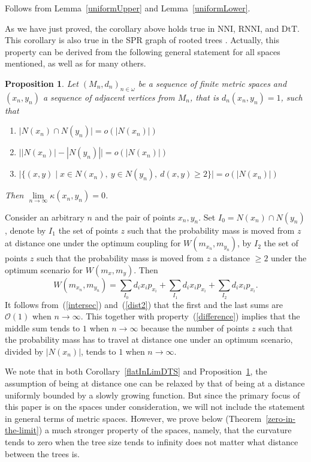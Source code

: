 \documentclass[11pt]{amsart}
\newtheorem{proposition}[lemma]{Proposition}
\theoremstyle{definition}
\newcommand{\nni}{\mathrm{NNI}}
\newcommand{\rnni}{\mathrm{RNNI}}
\newcommand{\dtt}{\mathrm{DtT}}
\renewcommand{\O}{\mathcal{O}}
\begin{document}
{\proof
Follows from Lemma~\ref{uniformUpper} and Lemma~\ref{uniformLower}.
\endproof

As we have just proved, the corollary above holds true in $\nni$, $\rnni$, and $\dtt$.
This corollary is also true in the SPR graph of rooted trees \autocite{Whidden2015-es}.
Actually, this property can be derived from the following general statement for all spaces mentioned, as well as for many others.

\begin{proposition}
\label{flatInLimGen}
Let $(M_n,d_n)_{n \in \omega}$ be a sequence of finite metric spaces and $(x_n, y_n)$ a sequence of adjacent vertices from $M_n$, that is $d_n(x_n,y_n) = 1$, such that
 \begin{enumerate} [(1)]
\item
\label{intersec}
$\big|N(x_n) \cap N(y_n)\big| = o(|N(x_n)|)$
\item
\label{difference}
$\big||N(x_n)| - |N(y_n)|\big| = o(|N(x_n)|)$
\item
\label{dist2}
$\big|\{(x,y) \mid
	x \in N(x_n),~ y \in N(y_n),~ d(x, y) \geq 2\}\big| = o(|N(x_n)|)$
 \end{enumerate} 

Then $\lim\limits_{n \to \infty} \kappa(x_n, y_n) = 0$.
\end{proposition}

\proof
Consider an arbitrary $n$ and the pair of points $x_n,y_n$.
Set $I_0 = N(x_n) \cap N(y_n)$, denote by $I_1$ the set of points $z$ such that the probability mass is moved from $z$ at distance one under the optimum coupling for $W(m_{x_n},m_{y_n})$, by $I_2$ the set of points $z$ such that the probability mass is moved from $z$ a distance $\geq 2$ under the optimum scenario for $W(m_x,m_y)$.
Then
\[
W(m_{x_n},m_{y_n}) = \sum_{I_0} d_i x_i p_{x_i} + \sum_{I_1} d_i x_i p_{x_i} +
\sum_{I_2} d_i x_i p_{x_i}.
\]
It follows from~(\ref{intersec}) and~(\ref{dist2}) that the first and the last sums are $\O(1)$ when $n\to\infty$.
This together with property~(\ref{difference}) implies that the middle sum tends to $1$ when $n\to\infty$ because the number of points $z$ such that the probability mass has to travel at distance one under an optimum scenario, divided by $|N(x_n)|$, tends to $1$ when $n\to\infty$.
\endproof

We note that in both Corollary~\ref{flatInLimDTS} and Proposition~\ref{flatInLimGen}, the assumption of being at distance one can be relaxed by that of being at a distance uniformly bounded by a slowly growing function.
But since the primary focus of this paper is on the spaces under consideration, we will not  include the statement in general terms of metric spaces.
However, we prove below (Theorem~\ref{zero-in-the-limit}) a much stronger property of the spaces, namely, that the curvature tends to zero when the tree size tends to infinity does not matter what distance between the trees is.
}
{}
\end{document}
